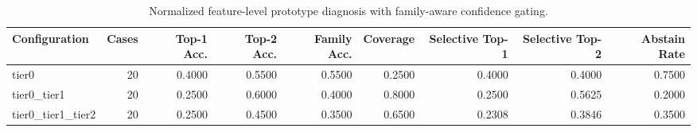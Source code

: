 \begin{table}[t]
\centering
\caption{Normalized feature-level prototype diagnosis with family-aware confidence gating.}
\label{tab:dice_stressor_hierarchical_diagnosis}
\footnotesize
\begin{tabular}{lrrrrrrrr}
\toprule
Configuration & Cases & Top-1 Acc. & Top-2 Acc. & Family Acc. & Coverage & Selective Top-1 & Selective Top-2 & Abstain Rate \\
\midrule
tier0 & 20 & 0.4000 & 0.5500 & 0.5500 & 0.2500 & 0.4000 & 0.4000 & 0.7500 \\
tier0_tier1 & 20 & 0.2500 & 0.6000 & 0.4000 & 0.8000 & 0.2500 & 0.5625 & 0.2000 \\
tier0_tier1_tier2 & 20 & 0.2500 & 0.4500 & 0.3500 & 0.6500 & 0.2308 & 0.3846 & 0.3500 \\
\bottomrule
\end{tabular}

\end{table}
